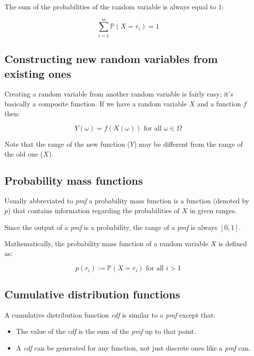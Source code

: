 The sum of the probabilities of the random variable is always equal to $1$:

\begin{dmath}
	\sum\limits_{i=1}^m\mathbb{P}(X=r_i) = 1
\end{dmath}

\subsection{Constructing new random variables from existing ones}
\label{subsec:new_random_vars}
Creating a random variable from another random variable is fairly easy; it's
basically a composite function. If we have a random variable $X$ and a function
$f$ then:

\begin{dmath}
	Y(\omega) = f(X(\omega)) \textrm{ for all $\omega \in \Omega$}
\end{dmath}

Note that the range of the new function ($Y$) may be different from the range of
the old one ($X$).

\subsection{Probability mass functions}

Usually abbreviated to {\it pmf} a probability mass function is a function
(denoted by $p$) that contains information regarding the probabilities of $X$ in
given ranges.

Since the output of a {\it pmf} is a probability, the range of a {\it pmf} is
always $[0,1]$.

Mathematically, the probability mass function of a random variable $X$ is
defined as:

\begin{dmath}
	p(r_i) := \mathbb{P}(X = r_i) \textrm{ for all $i > 1$}
\end{dmath}


\subsection{Cumulative distribution functions}

A cumulative distribution function {\it cdf} is similar to a {\it pmf} except
that:

\begin{itemize}
	\item The value of the {\it cdf} is the sum of the {\it pmf} up to that 
	point.
	\item A {\it cdf} can be generated for any function, not just discrete ones
	like a {\it pmf} can.
\end{itemize}

